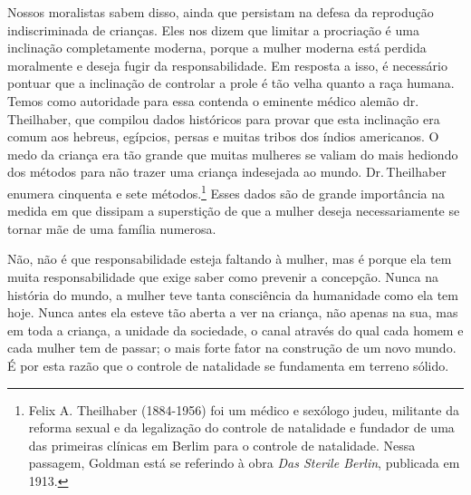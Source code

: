 Nossos moralistas sabem disso, ainda que persistam na defesa da
reprodução indiscriminada de crianças. Eles nos dizem que limitar a
procriação é uma inclinação completamente moderna, porque a mulher
moderna está perdida moralmente e deseja fugir da responsabilidade. Em
resposta a isso, é necessário pontuar que a inclinação de controlar a
prole é tão velha quanto a raça humana. Temos como autoridade para essa
contenda o eminente médico alemão dr.\,Theilhaber, que compilou dados
históricos para provar que esta inclinação era comum aos hebreus,
egípcios, persas e muitas tribos dos índios americanos. O medo da
criança era tão grande que muitas mulheres se valiam do mais hediondo
dos métodos para não trazer uma criança indesejada ao mundo. Dr.\,Theilhaber enumera cinquenta e sete métodos.\footnote{Felix A.
  Theilhaber (1884-1956) foi um médico e sexólogo judeu, militante da
  reforma sexual e da legalização do controle de natalidade e fundador
  de uma das primeiras clínicas em Berlim para o controle de natalidade.
  Nessa passagem, Goldman está se referindo à obra \emph{Das Sterile
  Berlin}, publicada em 1913.} Esses dados são de grande importância na
medida em que dissipam a superstição de que a mulher deseja necessariamente se tornar mãe
de uma família numerosa.

Não, não é que responsabilidade esteja faltando à mulher, mas é porque
ela tem muita responsabilidade que exige saber como prevenir a
concepção. Nunca na história do mundo, a mulher teve tanta consciência
da humanidade como ela tem hoje. Nunca antes ela esteve tão aberta a ver
na criança, não apenas na sua, mas em toda a criança, a unidade da
sociedade, o canal através do qual cada homem e cada mulher tem de
passar; o mais forte fator na construção de um novo mundo. É por esta
razão que o controle de natalidade se fundamenta em terreno sólido.

